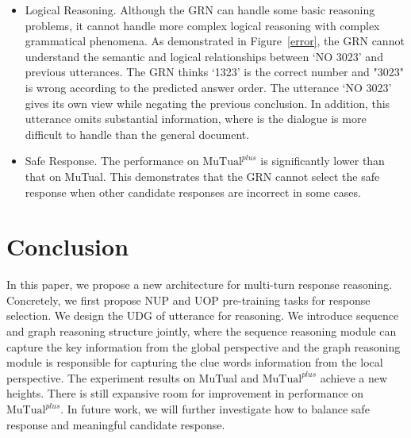 \documentclass[letterpaper]{article}
\begin{document}
\begin{itemize}
    \item Logical Reasoning. Although the GRN can handle some basic reasoning problems, it cannot handle more complex logical reasoning with complex grammatical phenomena. As demonstrated in Figure~\ref{error}, the GRN cannot understand the semantic and logical relationships between `NO 3023' and previous utterances. The GRN thinks `1323' is the correct number and "3023" is wrong according to the predicted answer order. The utterance `NO 3023' gives its own view while negating the previous conclusion. In addition, this utterance omits substantial information, where is the dialogue is more difficult to handle than the general document.
    \item Safe Response. The performance on $\text{MuTual}^{plus}$ is significantly lower than that on MuTual. This demonstrates that the GRN cannot select the safe response when other candidate responses are incorrect in some cases.
\end{itemize}

\section{Conclusion}
In this paper, we propose a new architecture for multi-turn response reasoning. Concretely, we first propose NUP and UOP pre-training tasks for response selection. We design the UDG of utterance for reasoning. We introduce sequence and graph reasoning structure jointly, where the sequence reasoning module can capture the key information from the global perspective and the graph reasoning module is responsible for capturing the clue words information from the local perspective. The experiment results on MuTual and $\text{MuTual}^{plus}$ achieve a new heights. There is still expansive room for improvement in performance on $\text{MuTual}^{plus}$. In future work, we will further investigate how to balance safe response and meaningful candidate response.
\end{document}
